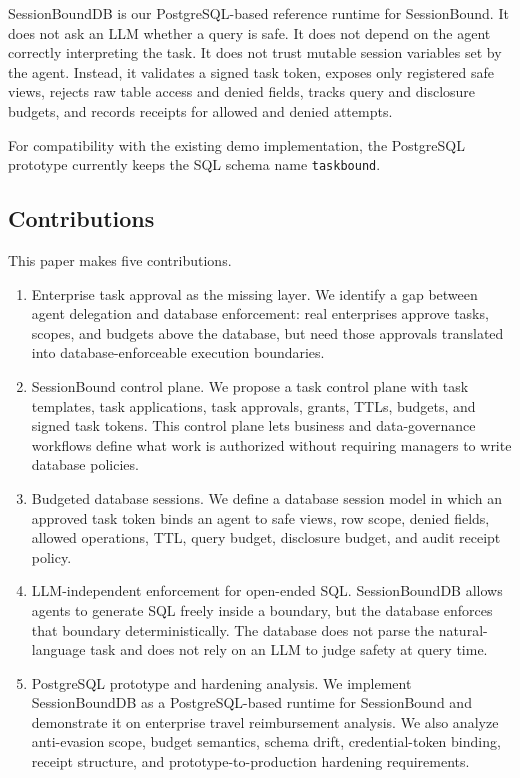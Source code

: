 \documentclass[journal]{IEEEtran}
\begin{document}
SessionBoundDB is our PostgreSQL-based reference runtime for
SessionBound. It does not ask an LLM whether a query is safe. It does
not depend on the agent correctly interpreting the task. It does not
trust mutable session variables set by the agent. Instead, it validates
a signed task token, exposes only registered safe views, rejects raw
table access and denied fields, tracks query and disclosure budgets, and
records receipts for allowed and denied attempts.

For compatibility with the existing demo implementation, the PostgreSQL
prototype currently keeps the SQL schema name \texttt{taskbound}.

\hypertarget{contributions}{%
\subsection{Contributions}\label{contributions}}

This paper makes five contributions.

\begin{enumerate}
\def\labelenumi{\arabic{enumi}.}
\item
  Enterprise task approval as the missing layer. We identify a
  gap between agent delegation and database enforcement: real
  enterprises approve tasks, scopes, and budgets above the database, but
  need those approvals translated into database-enforceable execution
  boundaries.
\item
  SessionBound control plane. We propose a task control plane
  with task templates, task applications, task approvals, grants, TTLs,
  budgets, and signed task tokens. This control plane lets business and
  data-governance workflows define what work is authorized without
  requiring managers to write database policies.
\item
  Budgeted database sessions. We define a database session
  model in which an approved task token binds an agent to safe views,
  row scope, denied fields, allowed operations, TTL, query budget,
  disclosure budget, and audit receipt policy.
\item
  LLM-independent enforcement for open-ended SQL.
  SessionBoundDB allows agents to generate SQL freely inside a boundary,
  but the database enforces that boundary deterministically. The
  database does not parse the natural-language task and does not rely on
  an LLM to judge safety at query time.
\item
  PostgreSQL prototype and hardening analysis. We implement
  SessionBoundDB as a PostgreSQL-based runtime for SessionBound and
  demonstrate it on enterprise travel reimbursement analysis. We also
  analyze anti-evasion scope, budget semantics, schema drift,
  credential-token binding, receipt structure, and
  prototype-to-production hardening requirements.
\end{enumerate}
\end{document}
